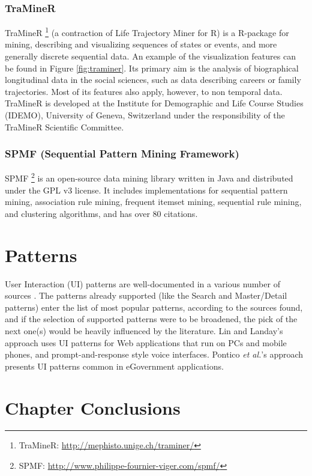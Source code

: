 \subsubsection*{TraMineR}
TraMineR \footnote{TraMineR: \url{http://mephisto.unige.ch/traminer/}} (a contraction of Life Trajectory Miner for R) is a R-package for mining, describing and visualizing sequences of states or events, and more generally discrete sequential data. An example of the visualization features can be found in Figure \ref{fig:traminer}. Its primary aim is the analysis of biographical longitudinal data in the social sciences, such as data describing careers or family trajectories. Most of its features also apply, however, to non temporal data. TraMineR is developed at the Institute for Demographic and Life Course Studies (IDEMO), University of Geneva, Switzerland under the responsibility of the TraMineR Scientific Committee. 


\subsubsection{SPMF (Sequential Pattern Mining Framework)}
SPMF \footnote{SPMF: \url{http://www.philippe-fournier-viger.com/spmf/}} is an open-source data mining library written in Java and distributed under the GPL v3 license. It includes implementations for sequential pattern mining, association rule mining, frequent itemset mining, sequential rule mining, and clustering algorithms, and has over 80 citations.

\section{Patterns}\label{sec:patterns}
User Interaction (UI) patterns are well-documented in a various number of sources \cite{tidwell2010designing,van2001patterns, neil12standard,sinnig2005patterns}. The patterns already supported (like the Search and Master/Detail patterns) enter the list of most popular patterns, according to the sources found, and if the selection of supported patterns were to be broadened, the pick of the next one(s) would be heavily influenced by the literature. Lin and Landay's approach \cite{lin2008employing} uses UI patterns for Web applications that run on PCs and mobile phones, and prompt-and-response style voice interfaces. Pontico \textit{et al.}'s approach \cite{pontico2008organizing} presents UI patterns common in eGovernment applications.

\section{Chapter Conclusions}
